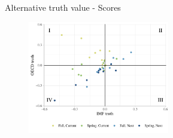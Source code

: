 \documentclass[en]{sdqbeamer}
\begin{document}
\begin{frame}{Alternative truth value - Scores}
\label{alternativetruth}
    \begin{figure}
        \includegraphics[width=0.55\textwidth]{figures/oecdvsimf.pdf}
        \label{fig:enter-label}
    \end{figure}   
\end{frame}
\end{document}
